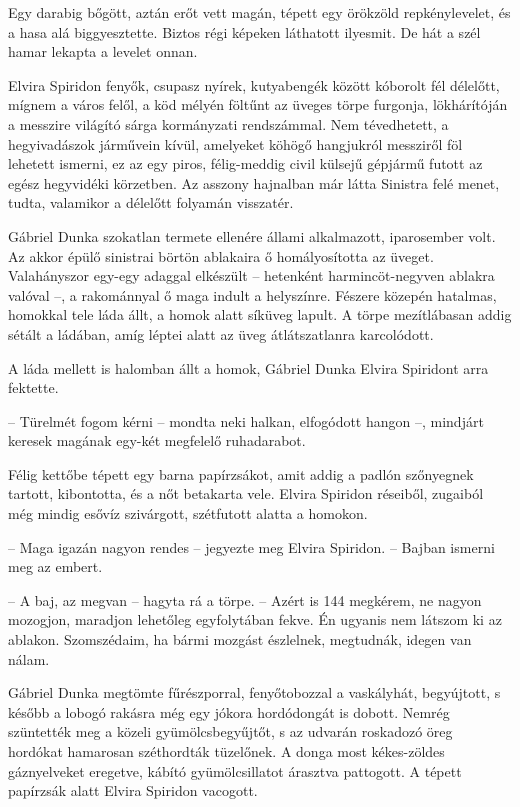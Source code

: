 \documentclass{IEEEtran}
\begin{document}
Egy darabig bőgött, aztán erőt vett magán, tépett egy örökzöld repkénylevelet,
és a hasa alá biggyesztette. Biztos régi képeken láthatott ilyesmit. De hát a
szél hamar lekapta a levelet onnan.

Elvira Spiridon fenyők, csupasz nyírek, kutyabengék között kóborolt fél
délelőtt, mígnem a város felől, a köd mélyén föltűnt az üveges törpe furgonja,
lökhárítóján a messzire világító sárga kormányzati rendszámmal. Nem
tévedhetett, a hegyivadászok járművein kívül, amelyeket köhögő hangjukról
messziről föl lehetett ismerni, ez az egy piros, félig-meddig civil külsejű
gépjármű futott az egész hegyvidéki körzetben. Az asszony hajnalban már látta
Sinistra felé menet, tudta, valamikor a délelőtt folyamán visszatér.

Gábriel Dunka szokatlan termete ellenére állami alkalmazott, iparosember volt.
Az akkor épülő sinistrai börtön ablakaira ő homályosította az üveget.
Valahányszor egy-egy adaggal elkészült – hetenként harmincöt-negyven ablakra
valóval –, a rakománnyal ő maga indult a helyszínre. Fészere közepén hatalmas,
homokkal tele láda állt, a homok alatt síküveg lapult. A törpe mezítlábasan
addig sétált a ládában, amíg léptei alatt az üveg átlátszatlanra karcolódott.

A láda mellett is halomban állt a homok, Gábriel Dunka Elvira Spiridont arra
fektette.

– Türelmét fogom kérni – mondta neki halkan, elfogódott hangon –, mindjárt
keresek magának egy-két megfelelő ruhadarabot.

Félig kettőbe tépett egy barna papírzsákot, amit addig a padlón szőnyegnek
tartott, kibontotta, és a nőt betakarta vele. Elvira Spiridon réseiből,
zugaiból még mindig esővíz szivárgott, szétfutott alatta a homokon.

– Maga igazán nagyon rendes – jegyezte meg Elvira Spiridon. – Bajban ismerni
meg az embert.

– A baj, az megvan – hagyta rá a törpe. – Azért is 144 megkérem, ne nagyon
mozogjon, maradjon lehetőleg egyfolytában fekve. Én ugyanis nem látszom ki az
ablakon. Szomszédaim, ha bármi mozgást észlelnek, megtudnák, idegen van nálam.

Gábriel Dunka megtömte fűrészporral, fenyőtobozzal a vaskályhát, begyújtott, s
később a lobogó rakásra még egy jókora hordódongát is dobott. Nemrég
szüntették meg a közeli gyümölcsbegyűjtőt, s az udvarán roskadozó öreg
hordókat hamarosan széthordták tüzelőnek. A donga most kékes-zöldes
gáznyelveket eregetve, kábító gyümölcsillatot árasztva pattogott. A tépett
papírzsák alatt Elvira Spiridon vacogott.
\end{document}
